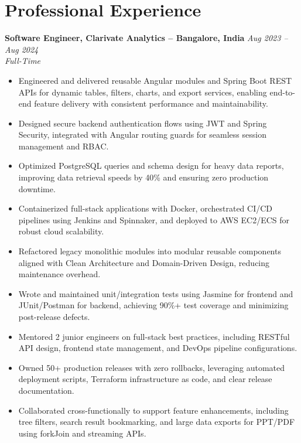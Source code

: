 \documentclass[10pt, letterpaper]{article}
\newenvironment{highlights}{\begin{itemize}[topsep=0.10 cm, parsep=0.10 cm, partopsep=0pt, itemsep=2pt, leftmargin=10pt]}{\end{itemize}}
\begin{document}
\newcommand{\experienceentry}[4]{%
  \noindent\textbf{#1} \hfill \textit{#2}\\
  \textit{#3} \\
  #4
}

\section{Professional Experience}

\experienceentry
  {Software Engineer, Clarivate Analytics -- Bangalore, India}
  {Aug 2023 -- Aug 2024}
  {Full-Time}
  {
    \begin{highlights}
        \item Engineered and delivered reusable Angular modules and Spring Boot REST APIs for dynamic tables, filters, charts, and export services, enabling end-to-end feature delivery with consistent performance and maintainability.
        
        \item Designed secure backend authentication flows using JWT and Spring Security, integrated with Angular routing guards for seamless session management and RBAC.
        
        \item Optimized PostgreSQL queries and schema design for heavy data reports, improving data retrieval speeds by 40\% and ensuring zero production downtime.
        
        \item Containerized full-stack applications with Docker, orchestrated CI/CD pipelines using Jenkins and Spinnaker, and deployed to AWS EC2/ECS for robust cloud scalability.
        
        \item Refactored legacy monolithic modules into modular reusable components aligned with Clean Architecture and Domain-Driven Design, reducing maintenance overhead.
        
        \item Wrote and maintained unit/integration tests using Jasmine for frontend and JUnit/Postman for backend, achieving 90\%+ test coverage and minimizing post-release defects.
        
        \item Mentored 2 junior engineers on full-stack best practices, including RESTful API design, frontend state management, and DevOps pipeline configurations.
        
        \item Owned 50+ production releases with zero rollbacks, leveraging automated deployment scripts, Terraform infrastructure as code, and clear release documentation.
        
        \item Collaborated cross-functionally to support feature enhancements, including tree filters, search result bookmarking, and large data exports for PPT/PDF using forkJoin and streaming APIs.
    \end{highlights}
  }
\end{document}
